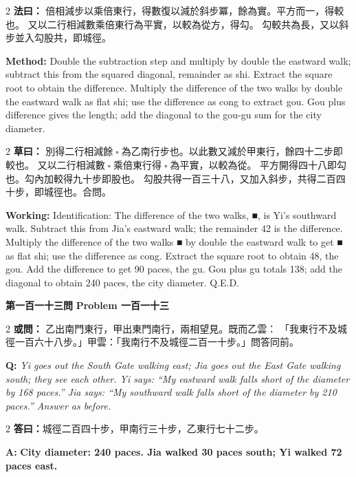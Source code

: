 \documentclass[11pt,a4paper]{article}
\let\origsquare\square
\renewcommand{\square}{\ensuremath{\origsquare}}%
\newcommand{\wen}[1]{%
  \par\vspace{0.5em}%
  \noindent\textcolor{problemcolor}{\textbf{第#1問}}%
  \hfill\textcolor{problemcolor}{\textbf{Problem #1}}\par\nopagebreak%
  \vspace{0.3em}%
}
\newcommand{\owen}[1]{%
  \noindent\textcolor{problemcolor}{\textbf{或問：}}{\tradfont #1}\par\nopagebreak%
}
\newcommand{\oweneng}[1]{%
  \noindent\textcolor{engcolor}{\textbf{Q: }}{\itshape #1}\par\nopagebreak%
}
\newcommand{\fayue}[1]{%
  \noindent\textcolor{methodcolor}{\textbf{法曰：}}{\tradfont #1}\par\nopagebreak%
}
\newcommand{\fayueeng}[1]{%
  \noindent\textcolor{engcolor}{\textbf{Method: }}{#1}\par\nopagebreak%
}
\newcommand{\tsaoyue}[1]{%
  \noindent\textcolor{workcolor}{\textbf{草曰：}}{\tradfont #1}\par%
}
\newcommand{\tsaoyueeng}[1]{%
  \noindent\textcolor{engcolor}{\textbf{Working: }}{\small #1}\par%
}
\newcommand{\dayue}[1]{%
  \noindent\textcolor{anscolor}{\textbf{答曰：}}{\tradfont #1}\par\nopagebreak%
}
\newcommand{\dayueeng}[1]{%
  \noindent\textcolor{engcolor}{\textbf{A: }}{\bfseries #1}\par\nopagebreak%
}
\begin{document}
\begin{paracol}{2}
\fayue{%
倍相減步以乘倍東行，得數復以減於斜步冪，餘為實。平方而一，得較也。
又以二行相減數乘倍東行為平實，以較為從方，得勾。
勾較共為長，又以斜步並入勾股共，即城徑。}
\switchcolumn
\fayueeng{%
Double the subtraction step and multiply by double the eastward walk; subtract this from the squared diagonal, remainder as shi. Extract the square root to obtain the difference. Multiply the difference of the two walks by double the eastward walk as flat shi; use the difference as cong to extract gou. Gou plus difference gives the length; add the diagonal to the gou-gu sum for the city diameter.}
\end{paracol}

\begin{paracol}{2}
\tsaoyue{%
別得二行相減餘$ \; \square \; $為乙南行步也。以此數又減於甲東行，餘四十二步即較也。
又以二行相減數$ \; \square \; $乘倍東行得$ \; \square \; $為平實，以較為從。
平方開得四十八即勾也。勾內加較得九十步即股也。
勾股共得一百三十八，又加入斜步，共得二百四十步，即城徑也。合問。}
\switchcolumn
\tsaoyueeng{%
Identification: The difference of the two walks, ■, is Yi's southward walk. Subtract this from Jia's eastward walk; the remainder 42 is the difference. Multiply the difference of the two walks ■ by double the eastward walk to get ■ as flat shi; use the difference as cong. Extract the square root to obtain 48, the gou. Add the difference to get 90 paces, the gu. Gou plus gu totals 138; add the diagonal to obtain 240 paces, the city diameter. Q.E.D.}
\end{paracol}

\vspace{0.5cm}

\wen{一百一十三}

\begin{paracol}{2}
\owen{%
乙出南門東行，甲出東門南行，兩相望見。既而乙雲：
「我東行不及城徑一百六十八步。」甲雲：「我南行不及城徑二百一十步。」問答同前。}
\switchcolumn
\oweneng{%
Yi goes out the South Gate walking east; Jia goes out the East Gate walking south; they see each other. Yi says: ``My eastward walk falls short of the diameter by 168 paces.'' Jia says: ``My southward walk falls short of the diameter by 210 paces.'' Answer as before.}
\end{paracol}

\begin{paracol}{2}
\dayue{城徑二百四十步，甲南行三十步，乙東行七十二步。}
\switchcolumn
\dayueeng{City diameter: 240 paces. Jia walked 30 paces south; Yi walked 72 paces east.}
\end{paracol}
\end{document}
